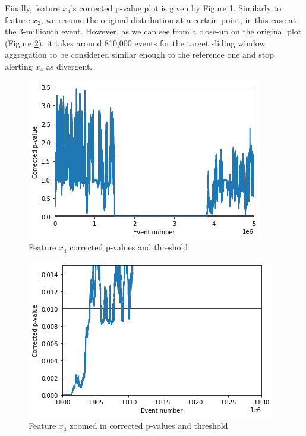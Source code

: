Finally, feature $x_4$'s corrected p-value plot is given by Figure \ref{fig:x4-corrected-pvalues}. Similarly to feature $x_2$, we resume the original distribution at a certain point, in this case at the 3-millionth event. However, as we can see from a close-up on the original plot (Figure \ref{fig:x4-corrected-pvalues-zoom}), it takes around 810,000 events for the target sliding window aggregation to be considered similar enough to the reference one and stop alerting $x_4$ as divergent.
\begin{figure}[!htb]
    \begin{center}
      \includegraphics[scale=0.8]{figures/x4-corrected-pvalues.png}
      \caption{Feature $x_4$ corrected p-values and threshold}
      \label{fig:x4-corrected-pvalues}
    \end{center}
\end{figure}
\begin{figure}[!htb]
    \begin{center}
      \includegraphics[scale=0.8]{figures/x4-corrected-pvalues-zoom2.png}
      \caption{Feature $x_4$ zoomed in corrected p-values and threshold}
      \label{fig:x4-corrected-pvalues-zoom}
    \end{center}
\end{figure}


